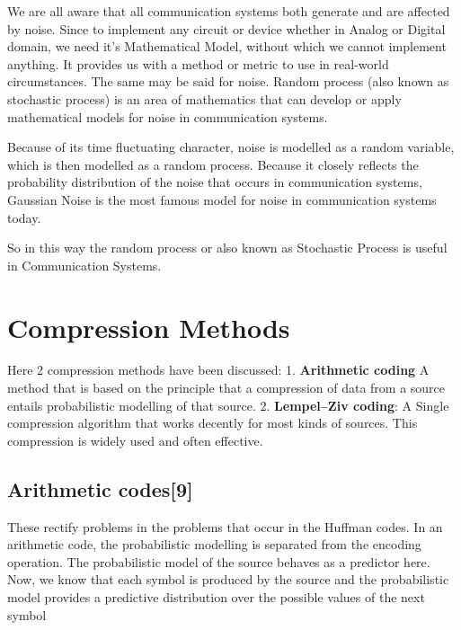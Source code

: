 \documentclass[10pt,twocolumn,letterpaper]{article}
\begin{document}
We are all aware that all communication systems both generate and are affected by noise. Since to implement any circuit or device whether in Analog or Digital domain, we need it’s Mathematical Model, without which we cannot implement anything. It provides us with a method or metric to use in real-world circumstances. The same may be said for noise. Random process (also known as stochastic process) is an area of mathematics that can develop or apply mathematical models for noise in communication systems.

Because of its time fluctuating character, noise is modelled as a random variable, which is then modelled as a random process. Because it closely reflects the probability distribution of the noise that occurs in communication systems, Gaussian Noise is the most famous model for noise in communication systems today.

So in this way the random process or also known as Stochastic Process is useful in Communication Systems.


\section{Compression Methods}
Here 2 compression methods have been discussed:
1. \textbf{Arithmetic coding} A method that is based on the principle that a compression of data from a source entails probabilistic modelling of that source. 
2. \textbf{Lempel–Ziv coding}: A Single compression algorithm that works decently for most kinds of sources. This compression is widely used and often effective.

\subsection{Arithmetic codes{\small[9]}}

These rectify problems in the problems that occur in the Huffman codes.  In an arithmetic code, the probabilistic modelling is
separated from the encoding operation. The probabilistic model of the source behaves as a predictor here. 
Now, we know that each symbol is produced by the source and the probabilistic model provides a predictive distribution over the possible values of the next symbol
\end{document}
